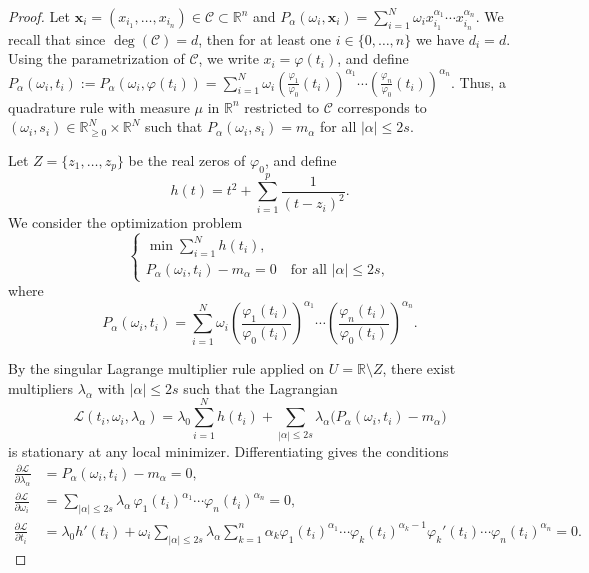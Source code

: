 \documentclass[11pt,a4paper]{amsart}
\numberwithin{equation}{section}
\theoremstyle{definition}
\newcommand{\R}{\mathbb{R}}
\newcommand{\xx}{\mathbf{x}}
\numberwithin{thm}{section}
\theoremstyle{break}
\numberwithin{subcase}{case}
\begin{document}
\begin{proof}
{Let $\xx_i=(x_{i_1},\dots,x_{i_n})\in\mathcal C\subset\R^n$ and $P_\alpha(\omega_i,\xx_i)=\sum_{i=1}^N\omega_ix_{i_1}^{\alpha_1}\cdots x_{i_n}^{\alpha_n}$. We recall that since $\deg(\mathcal C)=d$, then for at least one $i\in\{0,\dots,n\}$ we have $d_i=d$. {Using the parametrization of $\mathcal C$, we write $x_i = \varphi(t_i)$, and define $P_\alpha(\omega_i, t_i) := P_\alpha(\omega_i, \varphi(t_i)) =\sum_{i=1}^N\omega_i\left(\frac{\varphi_1}{\varphi_0}(t_i)\right)^{\alpha_1}\cdots\left(\frac{\varphi_n}{\varphi_0}(t_i)\right)^{\alpha_n}$. Thus, a quadrature rule with measure $\mu$ in $\R^n$ restricted to $\mathcal C$ corresponds to $(\omega_i,s_i)\in \R^N_{\geq 0}\times \R^N$ such that $P_{\alpha}(\omega_i,s_i)=m_\alpha$ for all $|\alpha|\leq 2s$.}}

Let $Z = \{z_1,\dots,z_p\}$ be the real zeros of $\varphi_0$, and define  
\[
h(t) = t^2 + \sum_{i=1}^p \frac{1}{(t-z_i)^2}.
\]
We consider the optimization problem
\[
\begin{cases}
\min \sum_{i=1}^N h(t_i), \\
P_\alpha(\omega_i,t_i) - m_\alpha = 0 \quad \text{for all } |\alpha|\le 2s,
\end{cases}
\]
where
\[
P_\alpha(\omega_i,t_i)=\sum_{i=1}^N \omega_i \left(\frac{\varphi_1(t_i)}{\varphi_0(t_i)}\right)^{\alpha_1}
\dotsm \left(\frac{\varphi_n(t_i)}{\varphi_0(t_i)}\right)^{\alpha_n}.
\]

By the singular Lagrange multiplier rule \cite[Theorem 6.1.1, Remark 6.1.2(iv)]{Cla90} applied on $U=\mathbb R\setminus Z$,
there exist multipliers $\lambda_\alpha$ with $|\alpha|\le 2s$ such that the Lagrangian
\[
\mathcal L(t_i,\omega_i,\lambda_\alpha) =
{\lambda_0}\sum_{i=1}^N h(t_i) +
\sum_{|\alpha|\le 2s} \lambda_\alpha \bigl(P_\alpha(\omega_i,t_i)-m_\alpha\bigr)
\]
is stationary at any local minimizer. Differentiating gives the conditions
\begin{align*}
\frac{\partial \mathcal L}{\partial \lambda_\alpha} &= P_\alpha(\omega_i,t_i)-m_\alpha = 0, \\
\frac{\partial \mathcal L}{\partial \omega_i} &= \sum_{|\alpha|\le 2s} \lambda_\alpha \,\varphi_1(t_i)^{\alpha_1}\dotsm \varphi_n(t_i)^{\alpha_n} = 0, \\
\frac{\partial \mathcal L}{\partial t_i} &= {\lambda_0} h'(t_i) + 
\omega_i \sum_{|\alpha|\le 2s} \lambda_\alpha \sum_{k=1}^n 
\alpha_k \varphi_1(t_i)^{\alpha_1}\dotsm \varphi_k(t_i)^{\alpha_k-1}\varphi_k'(t_i)
\dotsm \varphi_n(t_i)^{\alpha_n} = 0.
\end{align*}


\end{proof}
\end{document}

